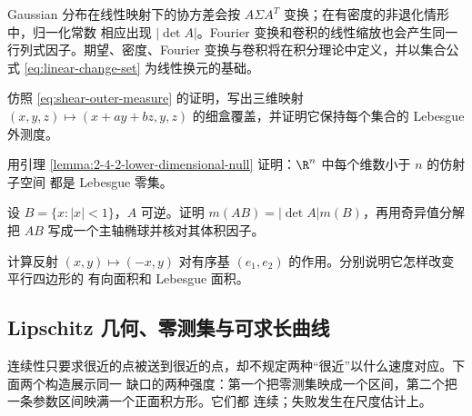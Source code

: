 Gaussian 分布在线性映射下的协方差会按 $A\Sigma A^{T}$ 变换；在有密度的非退化情形中，归一化常数
相应出现 $|\det A|$。Fourier 变换和卷积的线性缩放也会产生同一行列式因子。期望、密度、Fourier
变换与卷积将在积分理论中定义，并以集合公式 \eqref{eq:linear-change-set} 为线性换元的基础。

\begin{exercise}[剪切的外测度版本]\label{exercise:2-4-2-1}
仿照 \eqref{eq:shear-outer-measure} 的证明，写出三维映射
$(x,y,z)\mapsto(x+ay+bz,y,z)$ 的细盒覆盖，并证明它保持每个集合的 Lebesgue 外测度。
\end{exercise}

\begin{exercise}[仿射子空间]\label{exercise:2-4-2-2}
用引理 \ref{lemma:2-4-2-lower-dimensional-null} 证明：$\R^n$ 中每个维数小于 $n$ 的仿射子空间
都是 Lebesgue 零集。
\end{exercise}

\begin{exercise}[椭球体积]\label{exercise:2-4-2-3}
设 $B=\{x:|x|<1\}$，$A$ 可逆。证明
$m(AB)=|\det A|m(B)$，再用奇异值分解把 $AB$ 写成一个主轴椭球并核对其体积因子。
\end{exercise}

\begin{exercise}[有向面积与普通面积]\label{exercise:2-4-2-4}
计算反射 $(x,y)\mapsto(-x,y)$ 对有序基 $(e_1,e_2)$ 的作用。分别说明它怎样改变平行四边形的
有向面积和 Lebesgue 面积。
\end{exercise}

\subsection{Lipschitz 几何、零测集与可求长曲线}\label{subsec:2-4-3}

连续性只要求很近的点被送到很近的点，却不规定两种“很近”以什么速度对应。下面两个构造展示同一
缺口的两种强度：第一个把零测集映成一个区间，第二个把一条参数区间映满一个正面积方形。它们都
连续；失败发生在尺度估计上。


